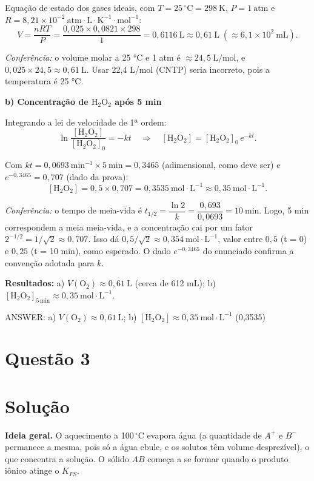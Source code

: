 \documentclass{article}%
\begin{document}
Equação de estado dos gases ideais, com $T=25\,^\circ\text{C}=298\ \text{K}$, $P=1\ \text{atm}$ e $R=8{,}21\times10^{-2}\ \text{atm}\cdot\text{L}\cdot\text{K}^{-1}\cdot\text{mol}^{-1}$:
\[
V=\frac{nRT}{P}=\frac{0{,}025\times 0{,}0821\times 298}{1}=0{,}6116\ \text{L}\approx 0{,}61\ \text{L}\;(\approx 6{,}1\times10^{2}\ \text{mL}).
\]

\emph{Conferência:} o volume molar a 25 °C e 1 atm é $\approx 24{,}5\ \text{L/mol}$, e $0{,}025\times 24{,}5\approx 0{,}61\ \text{L}$. Usar 22,4 L/mol (CNTP) seria incorreto, pois a temperatura é 25 °C.

\medskip
\textbf{b) Concentração de $\mathrm{H_2O_2}$ após 5 min}

Integrando a lei de velocidade de 1ª ordem:
\[
\ln\frac{[\mathrm{H_2O_2}]}{[\mathrm{H_2O_2}]_0}=-kt
\quad\Longrightarrow\quad
[\mathrm{H_2O_2}]=[\mathrm{H_2O_2}]_0\,e^{-kt}.
\]

Com $kt=0{,}0693\ \text{min}^{-1}\times 5\ \text{min}=0{,}3465$ (adimensional, como deve ser) e $e^{-0{,}3465}=0{,}707$ (dado da prova):
\[
[\mathrm{H_2O_2}]=0{,}5\times 0{,}707=0{,}3535\ \text{mol}\cdot\text{L}^{-1}\approx 0{,}35\ \text{mol}\cdot\text{L}^{-1}.
\]

\emph{Conferência:} o tempo de meia-vida é $t_{1/2}=\dfrac{\ln 2}{k}=\dfrac{0{,}693}{0{,}0693}=10\ \text{min}$. Logo, 5 min correspondem a meia meia-vida, e a concentração cai por um fator $2^{-1/2}=1/\sqrt2\approx 0{,}707$. Isso dá $0{,}5/\sqrt2\approx 0{,}354\ \text{mol}\cdot\text{L}^{-1}$, valor entre $0{,}5$ (t = 0) e $0{,}25$ (t = 10 min), como esperado. O dado $e^{-0{,}3465}$ do enunciado confirma a convenção adotada para $k$.

\medskip
\textbf{Resultados:} a) $V(\mathrm{O_2})\approx 0{,}61\ \text{L}$ (cerca de 612 mL); b) $[\mathrm{H_2O_2}]_{5\,\text{min}}\approx 0{,}35\ \text{mol}\cdot\text{L}^{-1}$.

ANSWER: a) $V(\mathrm{O_2})\approx 0{,}61\ \text{L}$; b) $[\mathrm{H_2O_2}]\approx 0{,}35\ \text{mol}\cdot\text{L}^{-1}$ (0,3535)%
\newpage%
\section*{Questão 3}

\section*{Solução}

\textbf{Ideia geral.} O aquecimento a 100\,$^\circ$C evapora água (a quantidade de $A^+$ e $B^-$ permanece a mesma, pois só a água ebule, e os solutos têm volume desprezível), o que concentra a solução. O sólido $AB$ começa a se formar quando o produto iônico atinge o $K_{PS}$.
\end{document}
